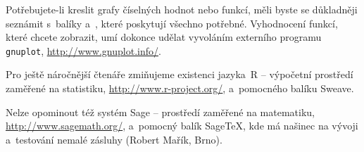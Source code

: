 \pagebreak
Potřebujete-li kreslit grafy číselných hodnot nebo funkcí, měli
byste se důkladněji seznámit s~balíky  a~, které poskytují
všechno potřebné. Vyhodnocení funkcí, které chcete zobrazit, umí
dokonce udělat vyvoláním externího programu \texttt{gnuplot}, \url{http://www.gnuplot.info/}.

Pro ještě náročnější čtenáře zmiňujeme existenci jazyka~R -- výpočetní prostředí zaměřené na statistiku, \url{http://www.r-project.org/}, a~pomocného balíku \textsf{Sweave}. 

Nelze opominout též systém Sage -- prostředí zaměřené na matematiku, \url{http://www.sagemath.org/}, a~pomocný balík Sage\TeX, kde má našinec na vývoji a~testování nemalé zásluhy (Robert Mařík, Brno).

